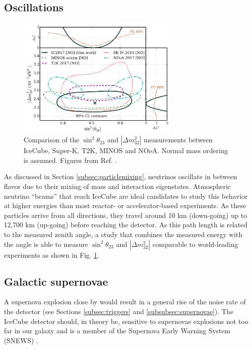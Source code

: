 \subsection{Oscillations}
\begin{figure}[t]
\centering
\includegraphics[width=0.7\textwidth]{chapter5/img/oscillations.png}
\caption{Comparison of the $\sin^2 \theta_{23}$ and $\left| \Delta m^2_{32}\right|$ measurements between IceCube, Super-K, T2K, MINOS and NO$\nu$A. Normal mass ordering is assumed. Figures from Ref. \cite{Aartsen:2017nmd}.}
\label{fig:oscillations}
\end{figure}

As discussed in Section \ref{subsec:particlemixing}, neutrinos oscillate in between flavor due to their mixing of mass and interaction eigenstates. Atmospheric neutrino ``beams'' that reach IceCube are ideal candidates to study this behavior at higher energies than most reactor- or accelerator-based experiments. As these particles arrive from all directions, they travel around 10 km (down-going) up to 12,700 km (up-going) before reaching the detector. As this path length is related to the measured zenith angle, a study that combines the measured energy with the angle is able to measure $\sin^2 \theta_{23}$ and $\left| \Delta m^2_{32}\right|$ comparable to world-leading experiments as shown in Fig. \ref{fig:oscillations}. 

\subsection{Galactic supernovae}
A supernova explosion close by would result in a general rise of the noise rate of the detector (see Sections \ref{subsec:triggers} and \ref{subsubsec:supernovae}). The IceCube detector should, in theory be, sensitive to supernovae explosions not too far in our galaxy \cite{Baum:2017rty} and is a member of the Supernova Early Warning System (SNEWS) \cite{Kowarik:2009qr}.

